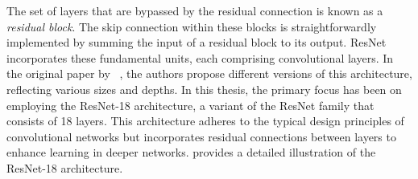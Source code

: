 The set of layers that are bypassed by the residual connection is known as a
\emph{residual block}. The skip connection within these blocks is
straightforwardly implemented by summing the input of a residual block to its
output. ResNet incorporates these fundamental units, each comprising
convolutional layers. In the original paper by
\citeauthor{he_resnet_2016}~\cite{he_resnet_2016}, the authors propose different
versions of this architecture, reflecting various sizes and depths. In this
thesis, the primary focus has been on employing the ResNet-18 architecture, a
variant of the ResNet family that consists of 18 layers. This architecture
adheres to the typical design principles of convolutional networks but
incorporates residual connections between layers to enhance learning in deeper
networks.  provides a detailed illustration of the ResNet-18
architecture.
